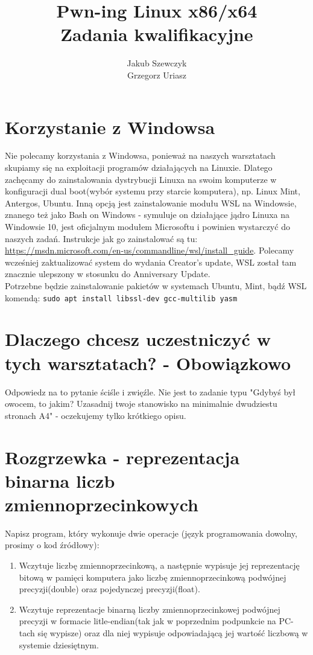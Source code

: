 \documentclass{article}
\title{Pwn-ing Linux x86/x64 \\ Zadania kwalifikacyjne}
\author{Jakub Szewczyk \\
Grzegorz Uriasz}
\begin{document}
\maketitle
\normalsize

\section{Korzystanie z Windowsa}
Nie polecamy korzystania z Windowsa, ponieważ na naszych warsztatach skupiamy się na exploitacji programów działających
na Linuxie. Dlatego zachęcamy do zainstalowania dystrybucji Linuxa na swoim komputerze w konfiguracji dual boot(wybór 
systemu przy starcie komputera), np. Linux Mint, Antergos, Ubuntu. Inną opcją jest zainstalowanie modułu WSL na Windowsie,
znanego też jako Bash on Windows - symuluje on działające jądro Linuxa na Windowsie 10, jest oficjalnym modułem Microsoftu
i powinien wystarczyć do naszych zadań. Instrukcje jak go zainstalować są tu: \url{https://msdn.microsoft.com/en-us/commandline/wsl/install_guide}. Polecamy wcześniej zaktualizować system do wydania Creator's update, WSL został
tam znacznie ulepszony w stosunku do Anniversary Update.\\
Potrzebne będzie zainstalowanie pakietów w systemach Ubuntu, Mint, bądź WSL komendą:
\texttt{sudo apt install libssl-dev gcc-multilib yasm}

\section{Dlaczego chcesz uczestniczyć w tych warsztatach? - Obowiązkowo}
Odpowiedz na to pytanie ściśle i zwięźle. Nie jest to zadanie typu "Gdybyś był owocem, to jakim? Uzasadnij twoje stanowisko na minimalnie dwudziestu stronach A4" - oczekujemy tylko krótkiego opisu.

\section{Rozgrzewka - reprezentacja binarna liczb zmiennoprzecinkowych}
Napisz program, który wykonuje dwie operacje (język programowania dowolny, prosimy o kod źródłowy):
\begin{enumerate}
\item Wczytuje liczbę zmiennoprzecinkową, a następnie wypisuje jej reprezentację bitową w pamięci komputera jako liczbę zmiennoprzecinkową podwójnej precyzji(double) oraz pojedynczej precyzji(float).
\item Wczytuje reprezentacje binarną liczby zmiennoprzecinkowej podwójnej precyzji w formacie litle-endian(tak jak w poprzednim podpunkcie na PC-tach się wypisze) oraz dla niej wypisuje odpowiadającą jej wartość liczbową w systemie dziesiętnym.
\end{enumerate}
\end{document}
